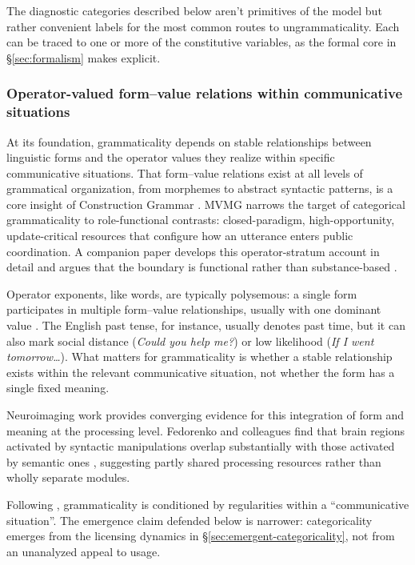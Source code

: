 \documentclass[12pt,letterpaper]{article}
\newcommand{\mention}[1]{\textit{#1}}
\begin{document}
The diagnostic categories described below aren't primitives of the model but rather convenient labels for the most common routes to ungrammaticality. Each can be traced to one or more of the constitutive variables, as the formal core in \S\ref{sec:formalism} makes explicit.

\subsubsection{Operator-valued form--value relations within communicative situations}\label{sec:f-m-pair-in-community}

At its foundation, grammaticality depends on stable relationships between linguistic forms and the operator values they realize within specific communicative situations. That form--value relations exist at all levels of grammatical organization, from morphemes to abstract syntactic patterns, is a core insight of Construction Grammar \autocite{goldberg1995constructions}. MVMG narrows the target of categorical grammaticality to role-functional contrasts: closed-paradigm, high-opportunity, update-critical resources that configure how an utterance enters public coordination. A companion paper develops this operator-stratum account in detail and argues that the boundary is functional rather than substance-based \autocite{reynolds2026operators}.%

Operator exponents, like words, are typically polysemous: a single form participates in multiple form--value relationships, usually with one dominant value \autocite{Kilgarriff2004}. The English past tense, for instance, usually denotes past time, but it can also mark social distance (\mention{Could you help me?}) or low likelihood (\mention{If I went tomorrow\dots}). What matters for grammaticality is whether a stable relationship exists within the relevant communicative situation, not whether the form has a single fixed meaning.

Neuroimaging work provides converging evidence for this integration of form and meaning at the processing level. Fedorenko and colleagues find that brain regions activated by syntactic manipulations overlap substantially with those activated by semantic ones \autocite{Fedorenko2011, Fedorenko2012, Fedorenko2024}, suggesting partly shared processing resources rather than wholly separate modules.

Following \textcite[3]{wiese2023}, grammaticality is conditioned by regularities within a \enquote{communicative situation}. The emergence claim defended below is narrower: categoricality emerges from the licensing dynamics in \S\ref{sec:emergent-categoricality}, not from an unanalyzed appeal to usage.
\end{document}
